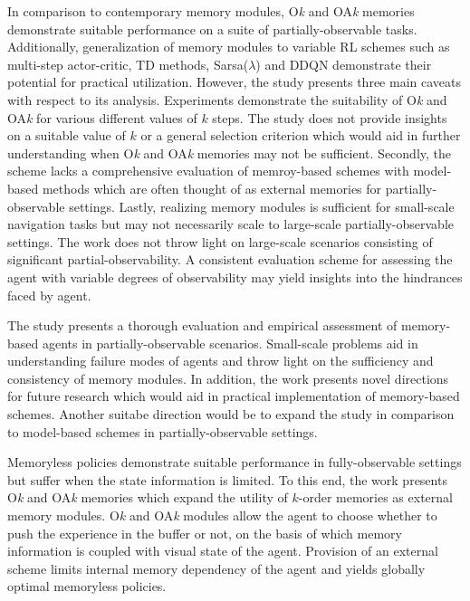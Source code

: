 \documentclass[11pt,letterpaper]{article}
\begin{document}
In comparison to contemporary memory modules, O\textit{k} and OA\textit{k} memories demonstrate suitable performance on a suite of partially-observable tasks. Additionally, generalization of memory modules to variable RL schemes such as multi-step actor-critic, TD methods, Sarsa($\lambda$) and DDQN demonstrate their potential for practical utilization. However, the study presents three main caveats with respect to its analysis. Experiments demonstrate the suitability of O\textit{k} and OA\textit{k} for various different values of $k$ steps. The study does not provide insights on a suitable value of $k$ or a general selection criterion which would aid in further understanding when O\textit{k} and OA\textit{k} memories may not be sufficient. Secondly, the scheme lacks a comprehensive evaluation of memroy-based schemes with model-based methods which are often thought of as external memories for partially-observable settings. Lastly, realizing memory modules is sufficient for small-scale navigation tasks but may not necessarily scale to large-scale partially-observable settings. The work does not throw light on large-scale scenarios consisting of significant partial-observability. A consistent evaluation scheme for assessing the agent with variable degrees of observability may yield insights into the hindrances faced by agent. 

The study presents a thorough evaluation and empirical assessment of memory-based agents in partially-observable scenarios. Small-scale problems aid in understanding failure modes of agents and throw light on the sufficiency and consistency of memory modules. In addition, the work presents novel directions for future research which would aid in practical implementation of memory-based schemes. Another suitabe direction would be to expand the study in comparison to model-based schemes in partially-observable settings. 

Memoryless policies demonstrate suitable performance in fully-observable settings but suffer when the state information is limited. To this end, the work presents O\textit{k} and OA\textit{k} memories which expand the utility of $k$-order memories as external memory modules. O\textit{k} and OA\textit{k} modules allow the agent to choose whether to push the experience in the buffer or not, on the basis of which memory information is coupled with visual state of the agent. Provision of an external scheme limits internal memory dependency of the agent and yields globally optimal memoryless policies. 
\end{document}
